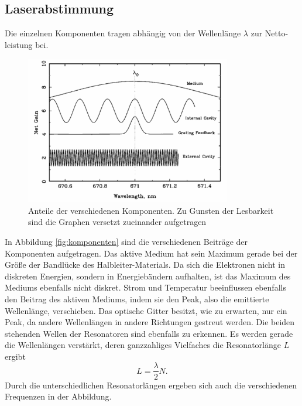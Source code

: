\subsection{Laserabstimmung}
Die einzelnen Komponenten tragen abhängig von der Wellenlänge $\lambda$ zur Netto-leistung bei.
\begin{figure}[h]
    \centering
    \includegraphics[width=0.8\textwidth]{abb/Laserabstimmung.png}
    \caption{Anteile der verschiedenen Komponenten. Zu Gunsten der Lesbarkeit sind die Graphen versetzt zueinander aufgetragen \cite{laser}}
    \label{fig:komponenten}
\end{figure}
In Abbildung \eqref{fig:komponenten} sind die verschiedenen Beiträge der Komponenten aufgetragen.
Das aktive Medium hat sein Maximum gerade bei der Größe der Bandlücke des Halbleiter-Materials.
Da sich die Elektronen nicht in diskreten Energien,
sondern in Energiebändern aufhalten, ist das Maximum des Mediums ebenfalls nicht diskret.
Strom und Temperatur beeinflussen ebenfalls den Beitrag des aktiven Mediums,
indem sie den Peak, also die emittierte Wellenlänge, verschieben.
Das optische Gitter besitzt, 
wie zu erwarten,
nur ein Peak,
da andere Wellenlängen in andere Richtungen gestreut werden. 
Die beiden stehenden Wellen der Resonatoren sind ebenfalls zu erkennen.
Es werden gerade die Wellenlängen verstärkt,
deren ganzzahliges Vielfaches die Resonatorlänge $L$ ergibt
\begin{equation*}
    L = \frac{\lambda}{2}N.
\end{equation*} 
Durch die unterschiedlichen Resonatorlängen ergeben sich auch die verschiedenen Frequenzen in der Abbildung.

